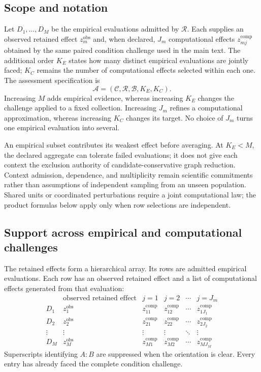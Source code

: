 \documentclass[11pt]{article}
\newcommand{\Regime}{\mathcal{R}}
\newcommand{\Assess}{\mathcal{A}}
\newcommand{\CSet}{\mathcal{C}}
\newcommand{\Boot}{\mathcal{B}}
\theoremstyle{remark}
\begin{document}
\subsection{Scope and notation}

Let $D_1,\ldots,D_M$ be the empirical evaluations admitted by $\Regime$.
Each supplies an observed retained effect $z_m^{\mathrm{obs}}$ and, when
declared, $J_m$ computational effects $z_{mj}^{\mathrm{comp}}$ obtained by
the same paired condition challenge used in the main text. The additional
order $K_E$ states how many distinct empirical evaluations are jointly faced;
$K_C$ remains the number of computational effects selected within each one.
The assessment specification is
\[
\Assess=(\CSet,\Regime,\Boot,K_E,K_C).
\]
Increasing $M$ adds empirical evidence, whereas increasing $K_E$ changes the
challenge applied to a fixed collection. Increasing $J_m$ refines a
computational approximation, whereas increasing $K_C$ changes its target.
No choice of $J_m$ turns one empirical evaluation into several.

An empirical subset contributes its weakest effect before averaging. At
$K_E<M$, the declared aggregate can tolerate failed evaluations; it does not
give each context the exclusion authority of candidate-conservative graph
reduction. Context admission, dependence, and multiplicity remain scientific
commitments rather than assumptions of independent sampling from an unseen
population. Shared units or coordinated perturbations require a joint
computational law; the product formulas below apply only when row selections
are independent.

\subsection{Support across empirical and computational challenges}
\label{sec:hierarchy}

The retained effects form a hierarchical array. Its rows are admitted
empirical evaluations. Each row has an observed retained effect and a list of
computational effects generated from that evaluation:
\begin{equation}
\begin{array}{c|c|cccc}
&\text{observed retained effect}&j=1&j=2&\cdots&j=J_m\\
\hline
D_1&z_1^{\mathrm{obs}}&z_{11}^{\mathrm{comp}}&z_{12}^{\mathrm{comp}}&\cdots&z_{1J_1}^{\mathrm{comp}}\\
D_2&z_2^{\mathrm{obs}}&z_{21}^{\mathrm{comp}}&z_{22}^{\mathrm{comp}}&\cdots&z_{2J_2}^{\mathrm{comp}}\\
\vdots&\vdots&\vdots&\vdots&\ddots&\vdots\\
D_M&z_M^{\mathrm{obs}}&z_{M1}^{\mathrm{comp}}&z_{M2}^{\mathrm{comp}}&\cdots&z_{MJ_M}^{\mathrm{comp}}
\end{array}
\label{eq:effect-array}
\end{equation}
Superscripts identifying $A:B$ are suppressed when the orientation is clear.
Every entry has already faced the complete condition challenge.
\end{document}
